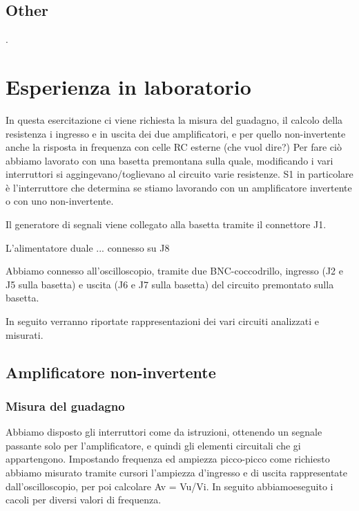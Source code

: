 \documentclass[a4paper]{article}
\begin{document}
		\subsection{Other}
			.
	\section{Esperienza in laboratorio}
		In questa esercitazione ci viene richiesta la misura del guadagno, il calcolo della resistenza i ingresso e in uscita dei due amplificatori, e per quello non-invertente anche la risposta in frequenza con celle RC esterne (che vuol dire?)
		Per fare ciò abbiamo lavorato con una basetta premontana sulla quale, modificando i vari interruttori si aggingevano/toglievano al circuito varie resistenze.
		S1 in particolare è l'interruttore che determina se stiamo lavorando con un amplificatore invertente o con uno non-invertente.
		
		Il generatore di segnali viene collegato alla basetta tramite il connettore J1.
		
		L'alimentatore duale ... connesso su J8
		
		Abbiamo connesso all'oscilloscopio, tramite due BNC-coccodrillo, ingresso (J2 e J5 sulla basetta)
		e uscita (J6 e J7 sulla basetta) del circuito premontato sulla basetta. %
		
		In seguito verranno riportate rappresentazioni dei vari circuiti analizzati e misurati.
		\subsection{Amplificatore non-invertente}
			\subsubsection{Misura del guadagno}
				Abbiamo disposto gli interruttori come da istruzioni, ottenendo un segnale passante solo per l'amplificatore, e quindi gli elementi circuitali che gi appartengono. %
				Impostando frequenza ed ampiezza picco-picco come richiesto abbiamo misurato tramite cursori l'ampiezza d'ingresso e di uscita rappresentate dall'oscilloscopio, per poi calcolare Av = Vu/Vi.
				In seguito abbiamoeseguito i cacoli per diversi valori di frequenza.
\end{document}
